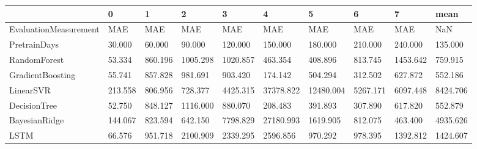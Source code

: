 \begin{tabular}{llllllllll}
\toprule
{} &       0 &       1 &        2 &        3 &         4 &         5 &        6 &        7 &     mean \\
\midrule
EvaluationMeasurement &     MAE &     MAE &      MAE &      MAE &       MAE &       MAE &      MAE &      MAE &      NaN \\
PretrainDays          &  30.000 &  60.000 &   90.000 &  120.000 &   150.000 &   180.000 &  210.000 &  240.000 &  135.000 \\
RandomForest          &  53.334 & 860.196 & 1005.298 & 1020.857 &   463.354 &   408.896 &  813.745 & 1453.642 &  759.915 \\
GradientBoosting      &  55.741 & 857.828 &  981.691 &  903.420 &   174.142 &   504.294 &  312.502 &  627.872 &  552.186 \\
LinearSVR             & 213.558 & 806.956 &  728.377 & 4425.315 & 37378.822 & 12480.004 & 5267.171 & 6097.448 & 8424.706 \\
DecisionTree          &  52.750 & 848.127 & 1116.000 &  880.070 &   208.483 &   391.893 &  307.890 &  617.820 &  552.879 \\
BayesianRidge         & 144.067 & 823.594 &  642.150 & 7798.829 & 27180.993 &  1619.905 &  812.075 &  463.400 & 4935.626 \\
LSTM                  &  66.576 & 951.718 & 2100.909 & 2339.295 &  2596.856 &   970.292 &  978.395 & 1392.812 & 1424.607 \\
\bottomrule
\end{tabular}
